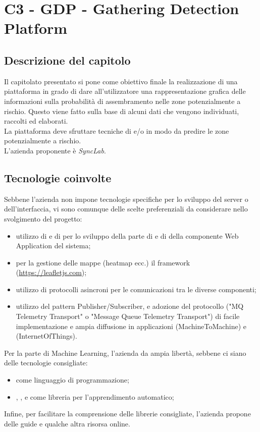\section{C3 - GDP - Gathering Detection Platform}

\subsection{Descrizione del capitolo}
Il capitolato presentato si pone come obiettivo finale la realizzazione di una piattaforma in grado di dare all'utilizzatore una rappresentazione grafica delle informazioni sulla probabilità di assembramento nelle zone potenzialmente a rischio. Questo viene fatto sulla base di alcuni dati che vengono individuati, raccolti ed elaborati. \\
La piattaforma deve sfruttare tecniche di  e/o  in modo da predire le zone potenzialmente a rischio.\\
L'azienda proponente è \textit{SyncLab}.

\subsection{Tecnologie coinvolte}
Sebbene l'azienda non impone tecnologie specifiche per lo sviluppo del server o dell'interfaccia, vi sono comunque delle scelte preferenziali da considerare nello svolgimento del progetto:
\begin{itemize}
\item utilizzo di  e di  per lo sviluppo della parte di  e di  della componente Web Application del sistema;
\item per la gestione delle mappe (heatmap ecc.) il framework  (\url{https://leafletjs.com});
\item utilizzo di protocolli asincroni per le comunicazioni tra le diverse componenti;
\item utilizzo del pattern Publisher/Subscriber, e adozione del protocollo  ("MQ Telemetry Transport" o "Message Queue Telemetry Transport") di facile implementazione e ampia diffusione in applicazioni  (MachineToMachine) e  (InternetOfThings).
\end{itemize}
Per la parte di Machine Learning, l'azienda da ampia libertà, sebbene ci siano delle tecnologie consigliate:
\begin{itemize}
\item {} come linguaggio di programmazione;
\item {}, ,  e  come libreria per l'apprendimento automatico;
\end{itemize}
Infine, per facilitare la comprensione delle librerie consigliate, l'azienda propone delle guide e qualche altra risorsa online.

